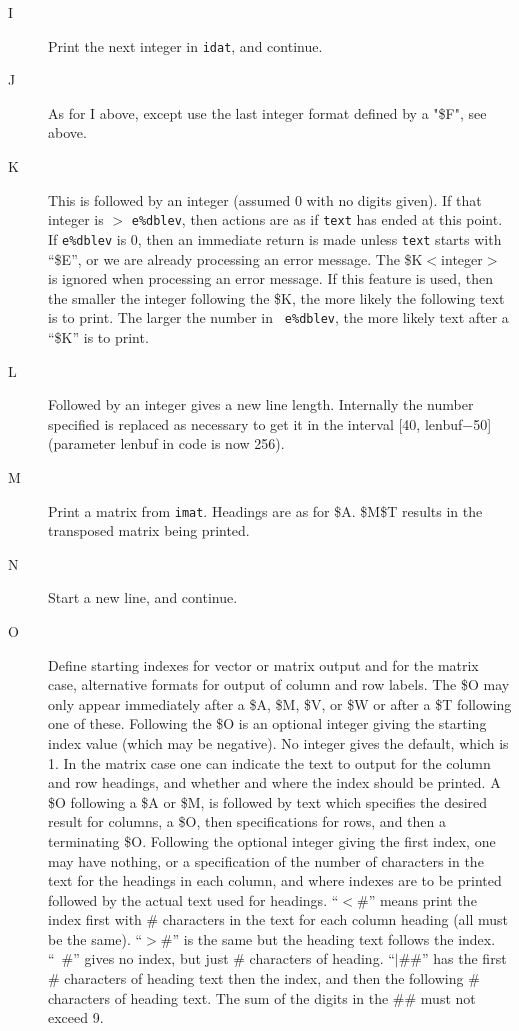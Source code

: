 \documentclass[12pt]{article}
\begin{document}
\begin{description}
\item[I] Print the next integer in {\tt idat}, and continue.

\item[J] As for I above, except use the last integer format defined by a "\$F",
  see above.

\item[K] This is followed by an integer (assumed 0 with no digits given).  If
  that integer is $>$ {\tt e\%dblev}, then actions are as if {\tt text} has
  ended at this point.  If {\tt e\%dblev} is 0, then an immediate return is made
  unless {\tt text} starts with ``\$E'', or we are already processing an error
  message.  The \$K$<$integer$>$ is ignored when processing an error message.
  If this feature is used, then the smaller the integer following the \$K, the
  more likely the following text is to print.  The larger the number in {\tt
    e\%dblev}, the more likely text after a ``\$K'' is to print.

\item[L] Followed by an integer gives a new line length.  Internally the number
  specified is replaced as necessary to get it in the interval [40, lenbuf$-$50]
  (parameter lenbuf in code is now 256).

\item[M] Print a matrix from {\tt imat}.  Headings are as for \$A.  \$M\$T
  results in the transposed matrix being printed.

\item[N] Start a new line, and continue.

\item[O] Define starting indexes for vector or matrix output and for the matrix
  case, alternative formats for output of column and row labels. The \$O may
  only appear immediately after a \$A, \$M, \$V, or \$W or after a \$T following
  one of these.  Following the \$O is an optional integer giving the starting
  index value (which may be negative).  No integer gives the default, which is
  1.  In the matrix case one can indicate the text to output for the column and
  row headings, and whether and where the index should be printed.  A \$O
  following a \$A or \$M, is followed by text which specifies the desired result
  for columns, a \$O, then specifications for rows, and then a terminating \$O.
  Following the optional integer giving the first index, one may have nothing,
  or a specification of the number of characters in the text for the headings in
  each column, and where indexes are to be printed followed by the actual text
  used for headings.  ``$<$\#'' means print the index first with \# characters
  in the text for each column heading (all must be the same).  ``$>$\#'' is the
  same but the heading text follows the index.  ``~\#'' gives no index, but just
  \# characters of heading.  ``$|$\#\#'' has the first \# characters of heading
  text then the index, and then the following \# characters of heading text.
  The sum of the digits in the \#\# must not exceed 9.


\end{description}
\end{document}
